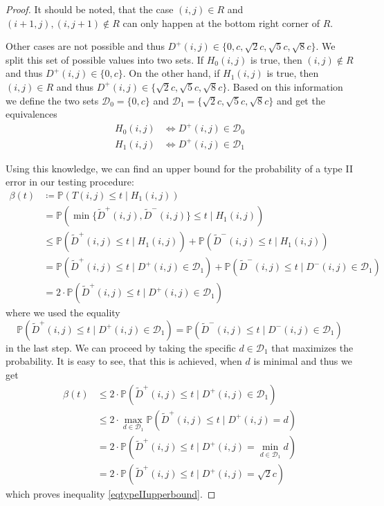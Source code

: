 \documentclass[a4paper,12pt]{article}
\theoremstyle{plain}
\theoremstyle{definition}
\theoremstyle{remark}
\begin{document}
\begin{proof}
	It should be noted, that the case $(i, j) \in R$ and $(i + 1, j), (i, j + 1) \notin R$ can only happen at the bottom right corner of $R$.
	
	Other cases are not possible and thus $D^+(i, j) \in \{ 0, c, \sqrt{2} c, \sqrt{5} c, \sqrt{8} c \}$. We split this set of possible values into two sets. If $H_0(i, j) $ is true, then $(i, j) \notin R$ and thus $D^+(i, j) \in \{ 0, c \}$. On the other hand, if $H_1(i, j)$ is true, then $(i, j) \in R$ and thus $D^+(i, j) \in \{ \sqrt{2} c, \sqrt{5} c, \sqrt{8} c \}$. Based on this information we define the two sets $\mathcal{D}_0 = \{ 0, c \}$ and $\mathcal{D}_1 = \{ \sqrt{2} c, \sqrt{5} c, \sqrt{8} c \}$ and get the equivalences
	\begin{equation}
		\begin{aligned}
			H_0(i, j) &\Leftrightarrow D^+(i, j) \in \mathcal{D}_0 \\
			H_1(i, j) &\Leftrightarrow D^+(i, j) \in \mathcal{D}_1
		\end{aligned}
	\end{equation}
	
	Using this knowledge, we can find an upper bound for the probability of a type II error in our testing procedure:
	\begin{align*}
		\beta(t) &\coloneqq \mathbb{P}(T(i, j) \leq t \mid H_1(i, j)) \\
		&= \mathbb{P}(\min \{ \tilde{D}^+(i, j), \tilde{D}^-(i, j) \} \leq t \mid H_1(i, j)) \\
		&\leq \mathbb{P}(\tilde{D}^+(i, j) \leq t \mid H_1(i, j)) + \mathbb{P}(\tilde{D}^-(i, j) \leq t \mid H_1(i, j)) \\
		&= \mathbb{P}(\tilde{D}^+(i, j) \leq t \mid D^+(i, j) \in \mathcal{D}_1) + \mathbb{P}(\tilde{D}^-(i, j) \leq t \mid D^-(i, j) \in \mathcal{D}_1) \\
		&= 2 \cdot \mathbb{P}(\tilde{D}^+(i, j) \leq t \mid D^+(i, j) \in \mathcal{D}_1)
	\end{align*}
	where we used the equality
	\begin{equation*}
		\mathbb{P}(\tilde{D}^+(i, j) \leq t \mid D^+(i, j) \in \mathcal{D}_1) = \mathbb{P}(\tilde{D}^-(i, j) \leq t \mid D^-(i, j) \in \mathcal{D}_1)
	\end{equation*}
	in the last step. We can proceed by taking the specific $d \in \mathcal{D}_1$ that maximizes the probability. It is easy to see, that this is achieved, when $d$ is minimal and thus we get
	\begin{align*}
		\beta(t) &\leq 2 \cdot \mathbb{P}(\tilde{D}^+(i, j) \leq t \mid D^+(i, j) \in \mathcal{D}_1) \\
		&\leq 2 \cdot \max_{d \in \mathcal{D}_1} \mathbb{P}(\tilde{D}^+(i, j) \leq t \mid D^+(i, j) = d) \\
		&= 2 \cdot \mathbb{P}(\tilde{D}^+(i, j) \leq t \mid D^+(i, j) = \min_{d \in \mathcal{D}_1} d) \\
		&= 2 \cdot \mathbb{P}(\tilde{D}^+(i, j) \leq t \mid D^+(i, j) = \sqrt{2} c)
	\end{align*}
	which proves inequality \eqref{eqtypeIIupperbound}.
	

\end{proof}
\end{document}
